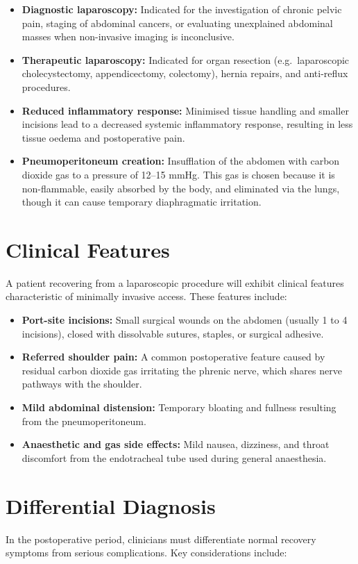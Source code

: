 \begin{itemize}
    \item \textbf{Diagnostic laparoscopy:} Indicated for the investigation of chronic pelvic pain, staging of abdominal cancers, or evaluating unexplained abdominal masses when non-invasive imaging is inconclusive.
    \item \textbf{Therapeutic laparoscopy:} Indicated for organ resection (e.g.\ laparoscopic cholecystectomy, appendicectomy, colectomy), hernia repairs, and anti-reflux procedures.
    \item \textbf{Reduced inflammatory response:} Minimised tissue handling and smaller incisions lead to a decreased systemic inflammatory response, resulting in less tissue oedema and postoperative pain.
    \item \textbf{Pneumoperitoneum creation:} Insufflation of the abdomen with carbon dioxide gas to a pressure of 12--15 mmHg. This gas is chosen because it is non-flammable, easily absorbed by the body, and eliminated via the lungs, though it can cause temporary diaphragmatic irritation.
\end{itemize}

\section*{Clinical Features}
A patient recovering from a laparoscopic procedure will exhibit clinical features characteristic of minimally invasive access. These features include:

\begin{itemize}
    \item \textbf{Port-site incisions:} Small surgical wounds on the abdomen (usually 1 to 4 incisions), closed with dissolvable sutures, staples, or surgical adhesive.
    \item \textbf{Referred shoulder pain:} A common postoperative feature caused by residual carbon dioxide gas irritating the phrenic nerve, which shares nerve pathways with the shoulder.
    \item \textbf{Mild abdominal distension:} Temporary bloating and fullness resulting from the pneumoperitoneum.
    \item \textbf{Anaesthetic and gas side effects:} Mild nausea, dizziness, and throat discomfort from the endotracheal tube used during general anaesthesia.
\end{itemize}

\section*{Differential Diagnosis}
In the postoperative period, clinicians must differentiate normal recovery symptoms from serious complications. Key considerations include:

